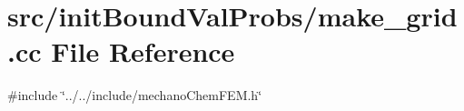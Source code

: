 \section{src/init\+Bound\+Val\+Probs/make\+\_\+grid.cc File Reference}
\label{make__grid_8cc}
{\ttfamily \#include \char`\"{}../../include/mechano\+Chem\+F\+E\+M.\+h\char`\"{}}\newline
